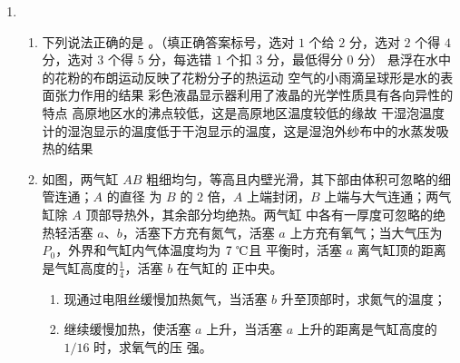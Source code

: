 \begin{enumerate}
\item 
{}
\begin{enumerate}
	\item
下列说法正确的是 \underlinegap 。（填正确答案标号，选对 $ 1 $ 个给 $ 2 $ 分，选对 $ 2 $ 个得 $ 4 $ 分，选对 $ 3 $ 个得 $ 5 $
分，每选错 $ 1 $ 个扣 $ 3 $ 分，最低得分 $ 0 $ 分）
\fivechoices
{悬浮在水中的花粉的布朗运动反映了花粉分子的热运动}
{空气的小雨滴呈球形是水的表面张力作用的结果}
{彩色液晶显示器利用了液晶的光学性质具有各向异性的特点}
{高原地区水的沸点较低，这是高原地区温度较低的缘故}
{干湿泡温度计的湿泡显示的温度低于干泡显示的温度，这是湿泡外纱布中的水蒸发吸热的结果}



\item 
如图，两气缸 $ AB $ 粗细均匀，等高且内壁光滑，其下部由体积可忽略的细管连通；$ A $ 的直径
为 $ B $ 的 $ 2 $ 倍，$ A $ 上端封闭，$ B $ 上端与大气连通；两气缸除 $ A $ 顶部导热外，其余部分均绝热。两气缸
中各有一厚度可忽略的绝热轻活塞 $ a $、$ b $，活塞下方充有氮气，活塞
$ a $ 上方充有氧气；当大气压为 $ P_{0} $，外界和气缸内气体温度均为 $ 7 \ \celsius $且
平衡时，活塞 $ a $ 离气缸顶的距离是气缸高度的$  \frac{ 1 }{ 4 }  $，活塞 $ b $ 在气缸的
正中央。
\begin{enumerate}
	\item
现通过电阻丝缓慢加热氮气，当活塞 $ b $ 升至顶部时，求氮气的温度；
\item 
继续缓慢加热，使活塞 $ a $ 上升，当活塞 $ a $ 上升的距离是气缸高度的 $ 1/16 $ 时，求氧气的压
强。
\end{enumerate}
\begin{figure}[h!]
	\centering
	
\end{figure}




\end{enumerate}
\end{enumerate}
